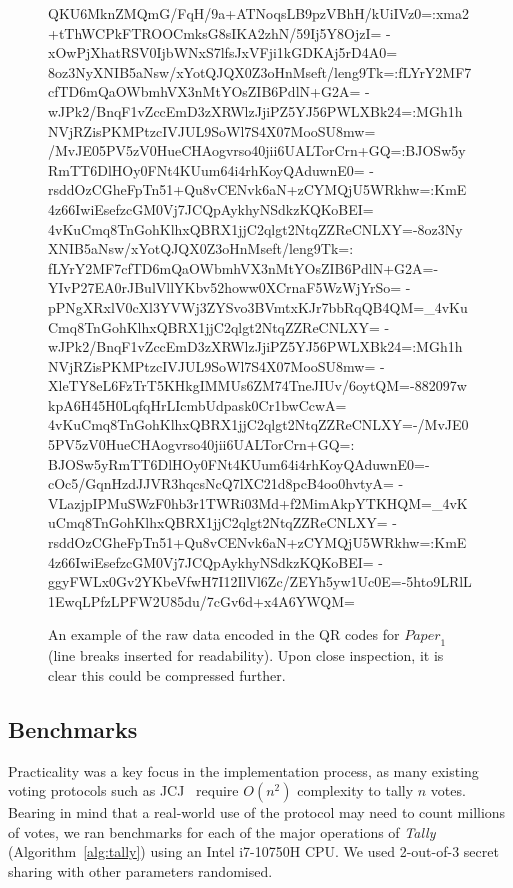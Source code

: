 \documentclass[12pt,a4paper]{article}
\theoremstyle{definition}
\newcommand{\Paper}{\mathit{Paper}}
\begin{document}
\begin{figure}
    \begin{verbnobox}[\tiny]
QKU6MknZMQmG/FqH/9a+ATNoqsLB9pzVBhH/kUiIVz0=:xma2+tThWCPkFTROOCmksG8sIKA2zhN/59Ij5Y8OjzI=
-xOwPjXhatRSV0IjbWNxS7lfsJxVFji1kGDKAj5rD4A0=
8oz3NyXNIB5aNsw/xYotQJQX0Z3oHnMseft/leng9Tk=:fLYrY2MF7cfTD6mQaOWbmhVX3nMtYOsZIB6PdlN+G2A=
-wJPk2/BnqF1vZccEmD3zXRWlzJjiPZ5YJ56PWLXBk24=:MGh1hNVjRZisPKMPtzcIVJUL9SoWl7S4X07MooSU8mw=
/MvJE05PV5zV0HueCHAogvrso40jii6UALTorCrn+GQ=:BJOSw5yRmTT6DlHOy0FNt4KUum64i4rhKoyQAduwnE0=
-rsddOzCGheFpTn51+Qu8vCENvk6aN+zCYMQjU5WRkhw=:KmE4z66IwiEsefzcGM0Vj7JCQpAykhyNSdkzKQKoBEI=
4vKuCmq8TnGohKlhxQBRX1jjC2qlgt2NtqZZReCNLXY=-8oz3NyXNIB5aNsw/xYotQJQX0Z3oHnMseft/leng9Tk=:
fLYrY2MF7cfTD6mQaOWbmhVX3nMtYOsZIB6PdlN+G2A=-YIvP27EA0rJBulVllYKbv52howw0XCrnaF5WzWjYrSo=
-pPNgXRxlV0cXl3YVWj3ZYSvo3BVmtxKJr7bbRqQB4QM=_4vKuCmq8TnGohKlhxQBRX1jjC2qlgt2NtqZZReCNLXY=
-wJPk2/BnqF1vZccEmD3zXRWlzJjiPZ5YJ56PWLXBk24=:MGh1hNVjRZisPKMPtzcIVJUL9SoWl7S4X07MooSU8mw=
-XleTY8eL6FzTrT5KHkgIMMUs6ZM74TneJIUv/6oytQM=-882097wkpA6H45H0LqfqHrLIcmbUdpask0Cr1bwCcwA=
4vKuCmq8TnGohKlhxQBRX1jjC2qlgt2NtqZZReCNLXY=-/MvJE05PV5zV0HueCHAogvrso40jii6UALTorCrn+GQ=:
BJOSw5yRmTT6DlHOy0FNt4KUum64i4rhKoyQAduwnE0=-cOc5/GqnHzdJJVR3hqcsNcQ7lXC21d8pcB4oo0hvtyA=
-VLazjpIPMuSWzF0hb3r1TWRi03Md+f2MimAkpYTKHQM=_4vKuCmq8TnGohKlhxQBRX1jjC2qlgt2NtqZZReCNLXY=
-rsddOzCGheFpTn51+Qu8vCENvk6aN+zCYMQjU5WRkhw=:KmE4z66IwiEsefzcGM0Vj7JCQpAykhyNSdkzKQKoBEI=
-ggyFWLx0Gv2YKbeVfwH7I12IlVl6Zc/ZEYh5yw1Uc0E=-5hto9LRlL1EwqLPfzLPFW2U85du/7cGv6d+x4A6YWQM=
    \end{verbnobox}
    \centering
    \caption{An example of the raw data encoded in the QR codes for $\Paper_1$ (line breaks inserted for readability). Upon close inspection, it is clear this could be compressed further.}
    \label{fig:prototype-paper-raw}
\end{figure}

\subsection{Benchmarks}
Practicality was a key focus in the implementation process, as many existing voting protocols such as JCJ~\cite{juels2010coercion} require $O(n^2)$ complexity to tally $n$ votes. Bearing in mind that a real-world use of the protocol may need to count millions of votes, we ran benchmarks for each of the major operations of \textit{Tally} (Algorithm~\ref{alg:tally}) using an Intel i7-10750H CPU. We used 2-out-of-3 secret sharing with other parameters randomised.
\end{document}
